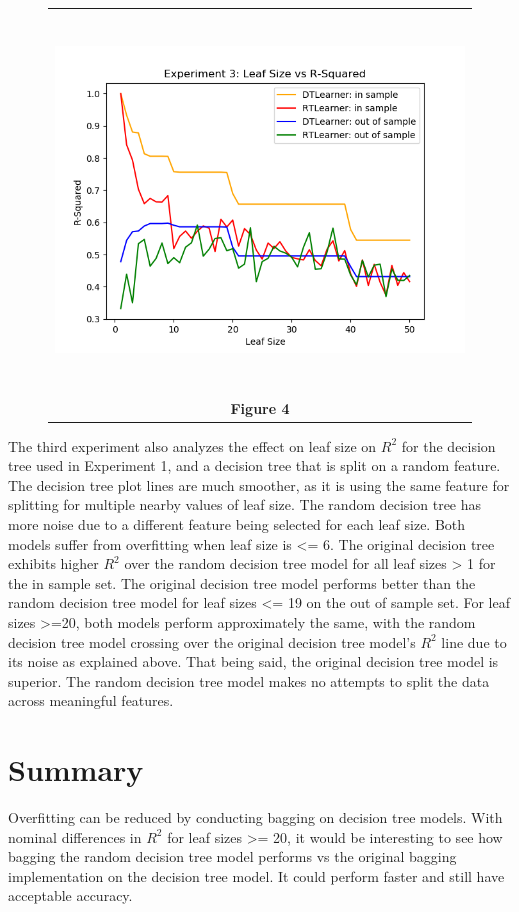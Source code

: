 \documentclass[
	letterpaper, %
]{jdf}
\begin{document}
\begin{figure}[h]
	\begin{tabular}{c}
		\includegraphics[height=10cm]{experiment_3b.png} \\
		\textbf{Figure 4} \\ 
	\end{tabular}
\end{figure}

The third experiment also analyzes the effect on leaf size on $R^{2}$ for the decision tree used in Experiment 1, and a decision tree that is split on a random feature. The decision tree plot lines are much smoother, as it is using the same feature for splitting for multiple nearby values of leaf size.  The random decision tree has more noise due to a different feature being selected for each leaf size.  Both models suffer from overfitting when leaf size is <= 6.  The original decision tree exhibits higher $R^{2}$ over the random decision tree model for all leaf sizes > 1 for the in sample set.  The original decision tree model performs better than the random decision tree model for leaf sizes <= 19 on the out of sample set.  For leaf sizes >=20, both models perform approximately the same, with the random decision tree model crossing over the original decision tree model's $R^{2}$ line due to its noise as explained above.  That being said, the original decision tree model is superior. The random decision tree model makes no attempts to split the data across meaningful features.

\section{Summary}
Overfitting can be reduced by conducting bagging on decision tree models.  With nominal differences in $R^{2}$ for leaf sizes >= 20, it would be interesting to see how bagging the random decision tree model performs vs the original bagging implementation on the decision tree model.  It could perform faster and still have acceptable accuracy.
\end{document}
